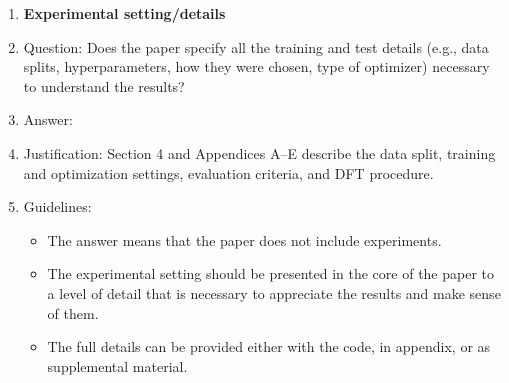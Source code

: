 \documentclass{article}
\theoremstyle{plain}
\theoremstyle{definition}
\theoremstyle{remark}
\begin{document}
\begin{enumerate}
\item {\bf Experimental setting/details}
    \item[] Question: Does the paper specify all the training and test details (e.g., data splits, hyperparameters, how they were chosen, type of optimizer) necessary to understand the results?
    \item[] Answer: \answerYes{} %
    \item[] Justification: Section 4 and Appendices A--E describe the data split, training and optimization settings, evaluation criteria, and DFT procedure.
    \item[] Guidelines:
    \begin{itemize}
        \item The answer \answerNA{} means that the paper does not include experiments.
        \item The experimental setting should be presented in the core of the paper to a level of detail that is necessary to appreciate the results and make sense of them.
        \item The full details can be provided either with the code, in appendix, or as supplemental material.
    \end{itemize}


\end{enumerate}
\end{document}
